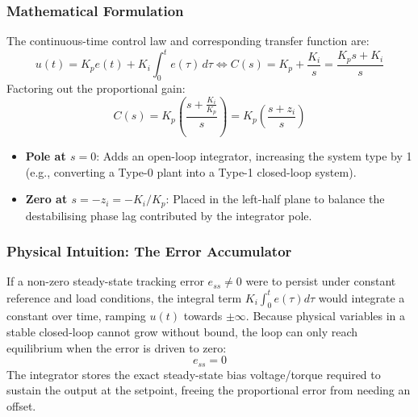 \documentclass[12pt,onecolumn,twoside ]{article}
\begin{document}
	\subsubsection{Mathematical Formulation}
	The continuous-time control law and corresponding transfer function are: \[
	u(t) = K_p e(t) + K_i \int_{0}^{t} e(\tau)\, d\tau \iff C(s) = K_p + \frac{K_i}{s} = \frac{K_p s + K_i}{s}
	\]
	Factoring out the proportional gain: \[
	C(s) = K_p \left( \frac{s + \frac{K_i}{K_p}}{s} \right) = K_p \left( \frac{s + z_i}{s} \right)
	\]
	\begin{itemize}
		\item
		\textbf{Pole at $s = 0$}: Adds an open-loop integrator, increasing the system type by 1 (e.g., converting a Type-0 plant into a Type-1 closed-loop system).
		\item
		\textbf{Zero at $s = -z_i = -K_i / K_p$}: Placed in the left-half plane to balance the destabilising phase lag contributed by the integrator pole.
	\end{itemize}
	\subsubsection{Physical Intuition: The Error Accumulator}
	If a non-zero steady-state tracking error $e_{ss} \ne 0$ were to persist under constant reference and load conditions, the integral term $K_i \int_0^t e(\tau) d\tau$ would integrate a constant over time, ramping $u(t)$ towards $\pm \infty$. Because physical variables in a stable closed-loop cannot grow without bound, the loop can only reach equilibrium when the error is driven to zero: \[
	e_{ss} = 0
	\] The integrator stores the exact steady-state bias voltage/torque required to sustain the output at the setpoint, freeing the proportional error from needing an offset.
	
\end{document}
